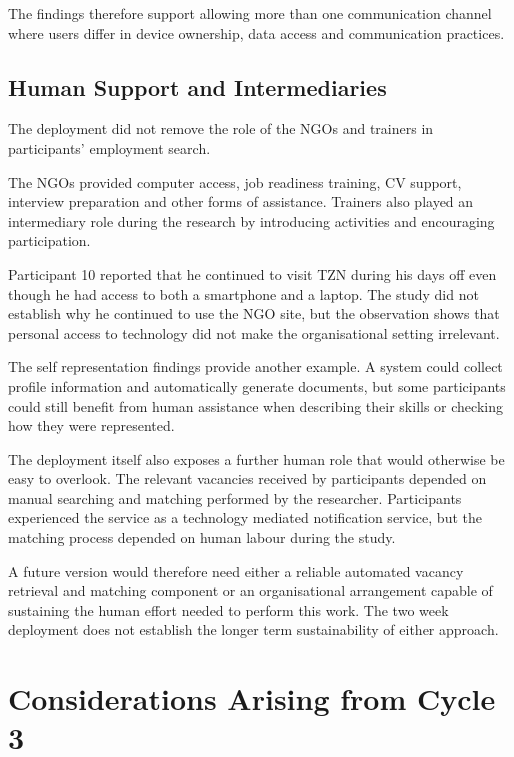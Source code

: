 The findings therefore support allowing more than one communication channel where users differ in device ownership, data access and communication practices.


\subsection{Human Support and Intermediaries}

The deployment did not remove the role of the NGOs and trainers in participants' employment search.

The NGOs provided computer access, job readiness training, CV support, interview preparation and other forms of assistance. Trainers also played an intermediary role during the research by introducing activities and encouraging participation.

Participant 10 reported that he continued to visit TZN during his days off even though he had access to both a smartphone and a laptop. The study did not establish why he continued to use the NGO site, but the observation shows that personal access to technology did not make the organisational setting irrelevant.

The self representation findings provide another example. A system could collect profile information and automatically generate documents, but some participants could still benefit from human assistance when describing their skills or checking how they were represented.

The deployment itself also exposes a further human role that would otherwise be easy to overlook. The relevant vacancies received by participants depended on manual searching and matching performed by the researcher. Participants experienced the service as a technology mediated notification service, but the matching process depended on human labour during the study.

A future version would therefore need either a reliable automated vacancy retrieval and matching component or an organisational arrangement capable of sustaining the human effort needed to perform this work. The two week deployment does not establish the longer term sustainability of either approach.


\section{Considerations Arising from Cycle 3}

